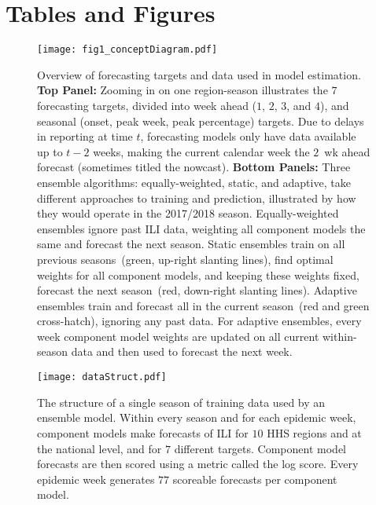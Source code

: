 \documentclass[sagev,times,Review,10pt]{sagej}
\begin{document}





\clearpage
\section{Tables and Figures}

\graphicspath{{../../../_6_TLGs/_G/fig1_conceptDiagram/}}
\begin{figure}[ht!]
  \centering
   \texttt{[image: fig1\_conceptDiagram.pdf]}
  \caption{
 Overview of forecasting targets and data used in model estimation. {\bf Top Panel:} Zooming in on one region-season illustrates the $7$ forecasting targets, divided into week ahead ($1$, $2$, $3$, and $4$), and seasonal (onset, peak week, peak percentage) targets.
    Due to delays in reporting at time $t$, forecasting models only have data available up to $t-2$ weeks, making the current calendar week the $2$~wk ahead forecast (sometimes titled the nowcast). 
    {\bf Bottom Panels:} Three ensemble algorithms: equally-weighted, static, and adaptive, take different approaches to training and prediction, illustrated by how they would operate in the 2017/2018 season. 
    Equally-weighted ensembles ignore past ILI data, weighting all component models the same and forecast the next season.
    Static ensembles train on all previous seasons~(green, up-right slanting lines), find optimal weights for all component models, and keeping these weights fixed, forecast the next season~(red, down-right slanting lines).
    Adaptive ensembles train and forecast all in the current season~(red and green cross-hatch), ignoring any past data.
    For adaptive ensembles, every week component model weights are updated on all current within-season data and then used to forecast the next week.
    \label{fig1.forecastingConcept}}
\end{figure}

\graphicspath{{../../../_6_TLGs/_G/fig_datastructure/}}
\begin{figure}[ht!]
  \centering
   \texttt{[image: dataStruct.pdf]}
   \caption{The structure of a single season of training data used by an ensemble model.
     Within every season and for each epidemic week, component models make forecasts of ILI for $10$ HHS regions and at the national level, and for $7$ different targets.
     Component model forecasts are then scored using a metric called the log score.
     Every epidemic week generates $77$ scoreable forecasts per component model. 
     \label{fig.DS} }
\end{figure}
\end{document}
